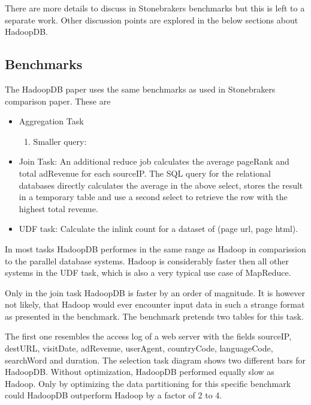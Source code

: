 \documentclass[12pt,a4paper]{scrartcl}		%
\begin{document}
There are more details to discuss in Stonebrakers benchmarks but this is left to a separate work. Other discussion points are explored in the below sections about HadoopDB.














\subsection{Benchmarks}
The HadoopDB paper uses the same benchmarks as used in Stonebrakers comparison paper. These are
\begin{itemize}

\item Aggregation Task
  \begin{enumerate}
  \item Smaller query:

  \end{enumerate}
  \item Join Task:
An additional reduce job calculates the average pageRank and total adRevenue for each sourceIP. The SQL query for the relational databases directly calculates the average in the above select, stores the result in a temporary table and use a second select to retrieve the row with the highest total revenue.
  \item UDF task: Calculate the inlink count for a dataset of (page url, page html).
\end{itemize}
In most tasks HadoopDB performes in the same range as Hadoop in comparission to the parallel database systems. Hadoop is considerably faster then all other systems in the UDF task, which is also a very typical use case of MapReduce.

Only in the join task HadoopDB is faster by an order of magnitude. It is however not likely, that Hadoop would ever encounter input data in such a strange format as presented in the benchmark. The benchmark pretends two tables for this task.

The first one resembles the access log of a web server with the fields sourceIP, destURL, visitDate, adRevenue, userAgent, countryCode, languageCode, searchWord and duration. 
The selection task diagram shows two different bars for HadoopDB. Without optimization, HadoopDB performed equally slow as Hadoop. Only by optimizing the data partitioning for this specific benchmark could HadoopDB outperform Hadoop by a factor of 2 to 4.
\end{document}
